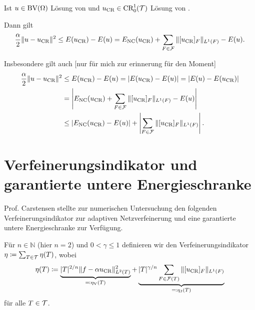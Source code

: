 \begin{corollary}
  Ist $u\in\textup{BV}(\Omega)$ Lösung von  und
  $u_\textup{CR}\in\textup{CR}^1_0(\mathcal{T})$ Lösung von .

  Dann gilt
  \begin{align*}
    \frac{\alpha}{2}\Vert u-u_\textup{CR}\Vert^2\leq
    E(u_\textup{CR})-E(u)=E_\textup{NC}(u_\textup{CR})+\sum_{F\in\mathcal{F}}\Vert[u_\textup{CR}]_F\Vert_{L^1(F)}-E(u).
  \end{align*}

  Insbesondere gilt auch  [nur für mich zur erinnerung für den Moment]
  \begin{align*}
    \frac{\alpha}{2}\Vert u-u_\textup{CR}\Vert^2&\leq
    E(u_\textup{CR})-E(u)=
    |E(u_\textup{CR})-E(u)|=
    |E(u)-E(u_\textup{CR})|\\
    &=\left|E_\textup{NC}(u_\textup{CR})+\sum_{F\in\mathcal{F}}\Vert[u_\textup{CR}]_F\Vert_{L^1(F)}-E(u)\right|\\
    &\leq
    \left|E_\textup{NC}(u_\textup{CR})-E(u)\right|+
    \left|\sum_{F\in\mathcal{F}}\Vert[u_\textup{CR}]_F\Vert_{L^1(F)}\right|.
  \end{align*}
\end{corollary}

\section{Verfeinerungsindikator und garantierte untere Energieschranke}
Prof. Carstensen stellte zur numerischen Untersuchung den folgenden
Verfeinerungsindikator zur adaptiven Netzverfeinerung  und eine 
garantierte untere Energieschranke zur Verfügung.

\begin{definition}[Verfeinerungsindikator]\label{def:refinementIndicator}
  Für $n\in\mathbb{N}$ (hier $n=2$) und $0<\gamma\leq 1$ definieren wir den
  Verfeinerungsindikator $\eta\coloneqq\sum_{T\in\mathcal{T}}\eta(T)$, wobei
  \begin{align} \label{eq:refinementIndicator} 
    \eta (T)\coloneqq
    \underbrace{|T|^{2/n}\Vert f-\alpha u_\textup{CR}\Vert^2_{L^2(T)}}_{\eqqcolon
    \eta_\text{V}(T)} +\underbrace{|T|^{\gamma/n}\sum_{F\in\mathcal{F}(T)}\Vert
    [u_\textup{CR}]_F\Vert_{L^1(F)}}_{ \eqqcolon \eta_\text{J}(T)} 
  \end{align} 
  für alle $T\in\mathcal{T}$.
\end{definition}

